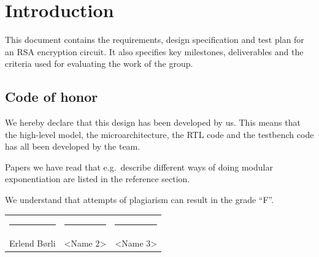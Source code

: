 \section{Introduction}

This document contains the requirements, design specification and test plan
for an RSA encryption circuit. It also specifies key milestones, deliverables
and the criteria used for evaluating the work of the group.

\subsection*{Code of honor}

We hereby declare that this design has been developed by us. This means that
the high-level model, the microarchitecture, the RTL code and the testbench
code has all been developed by the team.

Papers we have read that e.g.\ describe different ways of doing modular
exponentiation are listed in the reference section.

We understand that attempts of plagiarism can result in the grade ``F''.

\vspace{1cm}
\begin{tabular}{p{}p{}p{}}
\rule{0.28\textwidth}{0.4pt} & \rule{0.28\textwidth}{0.4pt} & \rule{0.28\textwidth}{0.4pt} \\
Erlend Børli & <Name 2> & <Name 3>
\end{tabular}
